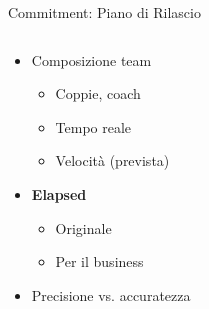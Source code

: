 	\begin{frame}{Commitment: Piano di Rilascio}

		\begin{columns}[T]
		    \begin{column}{.55\textwidth}

				\begin{itemize}
					\item Composizione team
					\begin{itemize}
						\item Coppie, coach
						\item Tempo reale
						\item Velocità (prevista)
					\end{itemize}
				\end{itemize}

				\begin{itemize}
					\item \textbf{Elapsed}
					\begin{itemize}
						\item Originale
						\item Per il business
					\end{itemize}
				\end{itemize}
				
				\begin{itemize}
					\item \small{Precisione vs. accuratezza}
				\end{itemize}
		
	    	\end{column}
	

\end{columns}
\end{frame}
